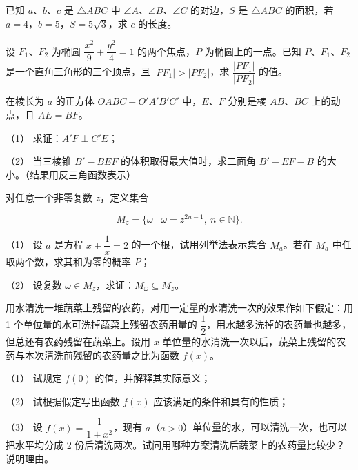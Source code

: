\begin{question}
已知 $a\text{、}b\text{、}c$ 是 $\triangle ABC$ 中 $\angle A\text{、}\angle B\text{、}\angle C$ 的对边，$S$ 是 $\triangle ABC$ 的面积，若 $a=4$，$b=5$，$S=5\sqrt3$，求 $c$ 的长度。

\end{question}
\begin{question}
设 $F_1\text{、}F_2$ 为椭圆 $\dfrac{x^2}{9}+\dfrac{y^2}{4}=1$ 的两个焦点，$P$ 为椭圆上的一点。已知 $P\text{、}F_1\text{、}F_2$ 是一个直角三角形的三个顶点，且 $|PF_1|>|PF_2|$，求 $\dfrac{|PF_1|}{|PF_2|}$ 的值。

\Needspace{0.4\textheight}
\end{question}
\begin{question}
在棱长为 $a$ 的正方体 $OABC-O'A'B'C'$ 中，$E\text{、}F$ 分别是棱 $AB\text{、}BC$ 上的动点，且 $AE=BF$。
\nopagebreak[4]
\begin{center}\end{center}
\nopagebreak[4]
（1） 求证：$A'F\perp C'E$；

（2） 当三棱锥 $B'-BEF$ 的体积取得最大值时，求二面角 $B'-EF-B$ 的大小。（结果用反三角函数表示）

\end{question}
\begin{question}
对任意一个非零复数 $z$，定义集合

\nopagebreak[4]
\[
M_z=\{\omega\mid \omega=z^{2n-1},\ n\in\mathbb N\}.
\]

（1） 设 $a$ 是方程 $x+\dfrac1x=2$ 的一个根，试用列举法表示集合 $M_a$。若在 $M_a$ 中任取两个数，求其和为零的概率 $P$；

（2） 设复数 $\omega\in M_z$，求证：$M_\omega\subseteq M_z$。

\end{question}
\begin{question}
用水清洗一堆蔬菜上残留的农药，对用一定量的水清洗一次的效果作如下假定：用 1 个单位量的水可洗掉蔬菜上残留农药用量的 $\dfrac12$，用水越多洗掉的农药量也越多，但总还有农药残留在蔬菜上。设用 $x$ 单位量的水清洗一次以后，蔬菜上残留的农药与本次清洗前残留的农药量之比为函数 $f(x)$。

（1） 试规定 $f(0)$ 的值，并解释其实际意义；

（2） 试根据假定写出函数 $f(x)$ 应该满足的条件和具有的性质；

（3） 设 $f(x)=\dfrac1{1+x^2}$，现有 $a$（$a>0$）单位量的水，可以清洗一次，也可以把水平均分成 2 份后清洗两次。试问用哪种方案清洗后蔬菜上的农药量比较少？说明理由。

\Needspace{0.4\textheight}
\end{question}
